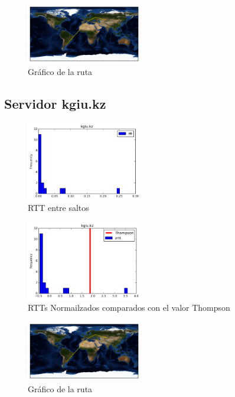 \begin{figure}[H]
  \centering
    \includegraphics[width=0.45\textwidth]{grafico-rutas/keu-kz.png}
  \caption{Gráfico de la ruta}
  \label{entropia-s}
\end{figure}




\subsection{Servidor kgiu.kz}
\begin{figure}[H]
  \centering
    \includegraphics[width=0.45\textwidth]{histogramas_rtt/kgiu-kz.png}
  \caption{RTT entre saltos}
  \label{entropia-s}
\end{figure}

\begin{figure}[H]
  \centering
    \includegraphics[width=0.45\textwidth]{histogramas_thompson/kgiu-kz.png}
  \caption{RTTs Normailzados comparados con el valor Thompson}
  \label{entropia-s}
\end{figure}

\begin{figure}[H]
  \centering
    \includegraphics[width=0.45\textwidth]{grafico-rutas/kgiu-kz.png}
  \caption{Gráfico de la ruta}
  \label{entropia-s}
\end{figure}




